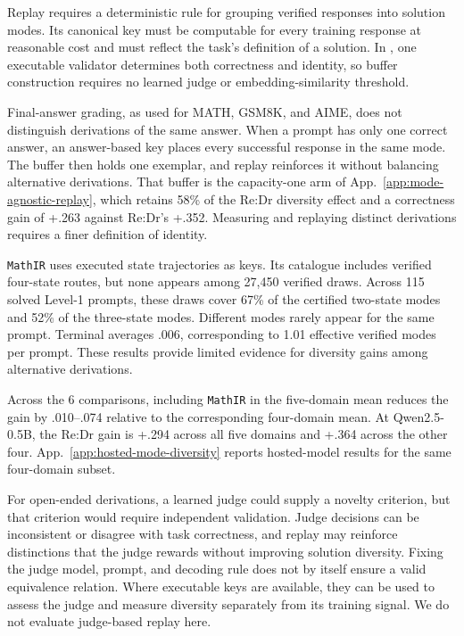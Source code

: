 Replay requires a deterministic rule for grouping verified responses into
solution modes. Its canonical key must be computable for every training
response at reasonable cost and must reflect the task's definition of a
solution. In \mb{}, one executable validator determines both correctness
and identity, so buffer construction requires no learned judge or
embedding-similarity threshold.

Final-answer grading, as used for MATH, GSM8K, and AIME, does not distinguish
derivations of the same answer. When a prompt has only one correct answer,
an answer-based key places every successful response in the same mode. The
buffer then holds one exemplar, and replay reinforces it without balancing
alternative derivations. That buffer is the capacity-one arm of
App.~\ref{app:mode-agnostic-replay}, which retains 58\% of the
Re:Dr diversity effect and a correctness gain of +.263 against
Re:Dr's +.352. Measuring and replaying distinct derivations
requires a finer definition of identity.

\texttt{MathIR} uses executed state trajectories as keys. Its catalogue
includes verified four-state routes, but none appears among 27,450
verified draws. Across 115 solved Level-1 prompts, these
draws cover 67\% of the certified two-state modes and
52\% of the three-state modes. Different modes rarely appear
for the same prompt. Terminal \pmd{} averages .006, corresponding
to 1.01 effective verified modes per prompt. These results provide
limited evidence for diversity gains among alternative derivations.

Across the 6 comparisons, including \texttt{MathIR} in the
five-domain mean reduces the \pmd{} gain by .010--.074
relative to the corresponding four-domain mean. At Qwen2.5-0.5B, the Re:Dr
gain is +.294 across all five domains and +.364 across the other
four. App.~\ref{app:hosted-mode-diversity} reports hosted-model results for
the same four-domain subset.

For open-ended derivations, a learned judge could supply a novelty criterion,
but that criterion would require independent validation. Judge decisions can
be inconsistent or disagree with task correctness, and replay may reinforce
distinctions that the judge rewards without improving solution diversity.
Fixing the judge model, prompt, and decoding rule does not by itself ensure
a valid equivalence relation. Where executable keys are available, they can
be used to assess the judge and measure diversity separately from its training
signal. We do not evaluate judge-based replay here.

